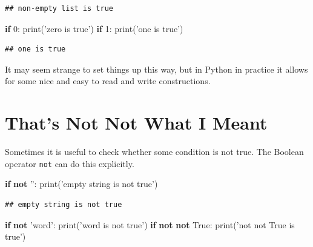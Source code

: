 \documentclass[]{book}
\newenvironment{Shaded}{\begin{snugshade}}{\end{snugshade}}
\newcommand{\BuiltInTok}[1]{#1}
\newcommand{\ControlFlowTok}[1]{\textcolor[rgb]{0.13,0.29,0.53}{\textbf{#1}}}
\newcommand{\DecValTok}[1]{\textcolor[rgb]{0.00,0.00,0.81}{#1}}
\newcommand{\KeywordTok}[1]{\textcolor[rgb]{0.13,0.29,0.53}{\textbf{#1}}}
\newcommand{\NormalTok}[1]{#1}
\newcommand{\StringTok}[1]{\textcolor[rgb]{0.31,0.60,0.02}{#1}}
\newcommand{\VariableTok}[1]{\textcolor[rgb]{0.00,0.00,0.00}{#1}}
\theoremstyle{definition}
\theoremstyle{definition}
\theoremstyle{definition}
\theoremstyle{remark}
\begin{document}
\begin{verbatim}
## non-empty list is true
\end{verbatim}

\begin{Shaded}
\begin{Highlighting}[]
\ControlFlowTok{if} \DecValTok{0}\NormalTok{:}
     \BuiltInTok{print}\NormalTok{(}\StringTok{'zero is true'}\NormalTok{)}
\ControlFlowTok{if} \DecValTok{1}\NormalTok{:}
    \BuiltInTok{print}\NormalTok{(}\StringTok{'one is true'}\NormalTok{)}
\end{Highlighting}
\end{Shaded}

\begin{verbatim}
## one is true
\end{verbatim}

It may seem strange to set things up this way, but in Python in practice
it allows for some nice and easy to read and write constructions.

\hypertarget{thats-not-not-what-i-meant}{%
\section{That's Not Not What I Meant}\label{thats-not-not-what-i-meant}}

Sometimes it is useful to check whether some condition is not true. The
Boolean operator \texttt{not} can do this explicitly.

\begin{Shaded}
\begin{Highlighting}[]
\ControlFlowTok{if} \KeywordTok{not} \StringTok{''}\NormalTok{:}
    \BuiltInTok{print}\NormalTok{(}\StringTok{'empty string is not true'}\NormalTok{)}
\end{Highlighting}
\end{Shaded}

\begin{verbatim}
## empty string is not true
\end{verbatim}

\begin{Shaded}
\begin{Highlighting}[]
\ControlFlowTok{if} \KeywordTok{not} \StringTok{'word'}\NormalTok{:}
    \BuiltInTok{print}\NormalTok{(}\StringTok{'word is not true'}\NormalTok{)}
\ControlFlowTok{if} \KeywordTok{not} \KeywordTok{not} \VariableTok{True}\NormalTok{:}
    \BuiltInTok{print}\NormalTok{(}\StringTok{'not not True is true'}\NormalTok{)}
\end{Highlighting}
\end{Shaded}
\end{document}
